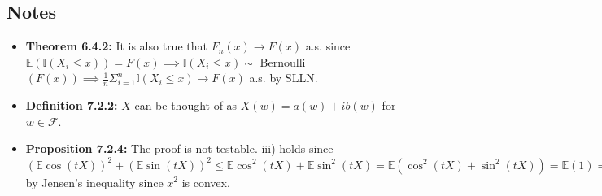 \documentclass[12pt]{article}
\newcommand{\E}{\mathbb{E}}
\newcommand{\I}{\mathbb{I}}
\begin{document}
\subsection*{Notes}
\begin{itemize}
    \item \textbf{Theorem 6.4.2:} It is also true that $F_n(x) \to F(x)$ a.s. since $\E(\I(X_i \leq x)) = F(x) \implies \I(X_i \leq x) \sim$ Bernoulli$(F(x)) \implies \frac{1}{n}\Sigma_{i=1}^n \I(X_i \leq x) \to F(x)$ a.s. by SLLN.
    \item \textbf{Definition 7.2.2:} $X$ can be thought of as $X(w) = a(w) + ib(w)$ for $w \in \mathcal{F}$.
    \item \textbf{Proposition 7.2.4:} The proof is not testable. iii) holds since $(\E\cos(tX))^2 + (\E\sin(tX))^2 \leq \E\cos^2(tX) + \E\sin^2(tX) = \E(\cos^2(tX) + \sin^2(tX)) = \E(1) = 1$ by Jensen's inequality since $x^2$ is convex.
\end{itemize}
\end{document}
